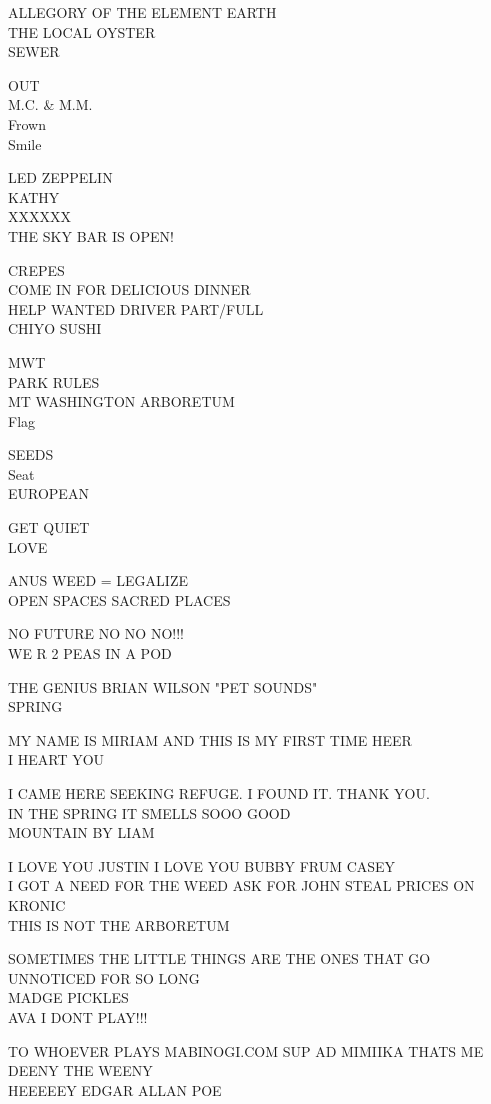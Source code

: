 \documentclass[10pt,letterpaper]{article}
\begin{document}
ALLEGORY OF THE ELEMENT EARTH\\
THE LOCAL OYSTER\\
SEWER

OUT\\
M.C. \& M.M.\\
Frown\\
Smile

LED ZEPPELIN\\
KATHY\\
XXXXXX\\
THE SKY BAR IS OPEN!

CREPES\\
COME IN FOR DELICIOUS DINNER\\
HELP WANTED DRIVER PART/FULL\\
CHIYO SUSHI

MWT\\
PARK RULES\\
MT WASHINGTON ARBORETUM\\
Flag

SEEDS\\
Seat\\
EUROPEAN

GET QUIET\\
LOVE

ANUS WEED = LEGALIZE\\
OPEN SPACES SACRED PLACES

NO FUTURE NO NO NO!!!\\
WE R 2 PEAS IN A POD

THE GENIUS BRIAN WILSON "PET SOUNDS"\\
SPRING

MY NAME IS MIRIAM AND THIS IS MY FIRST TIME HEER\\
I HEART YOU

I CAME HERE SEEKING REFUGE. I FOUND IT.  THANK YOU.\\
IN THE SPRING IT SMELLS SOOO GOOD\\
MOUNTAIN BY LIAM

I LOVE YOU JUSTIN I LOVE YOU BUBBY FRUM CASEY\\
I GOT A NEED FOR THE WEED ASK FOR JOHN STEAL PRICES ON KRONIC\\
THIS IS NOT THE ARBORETUM

SOMETIMES THE LITTLE THINGS ARE THE ONES THAT GO UNNOTICED FOR SO LONG\\
MADGE PICKLES\\
AVA I DONT PLAY!!!

TO WHOEVER PLAYS MABINOGI.COM SUP AD MIMIIKA THATS ME\\
DEENY THE WEENY\\
HEEEEEY EDGAR ALLAN POE
\end{document}

